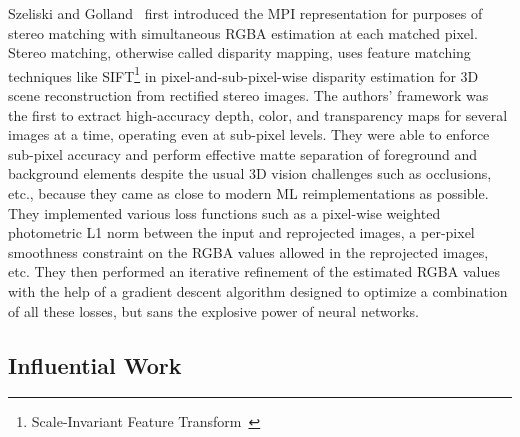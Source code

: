 Szeliski and Golland~\cite{szeliski_stereo_1999} first introduced the MPI representation for purposes of stereo matching with simultaneous RGBA estimation at each matched pixel. Stereo matching, otherwise called disparity mapping, uses feature matching techniques like SIFT\footnote{Scale-Invariant Feature Transform~\cite{lowe_distinctive_2004}} in pixel-and-sub-pixel-wise disparity estimation for 3D scene reconstruction from rectified stereo images. The authors' framework was the first to extract high-accuracy depth, color, and transparency maps for several images at a time, operating even at sub-pixel levels. They were able to enforce sub-pixel accuracy and perform effective matte separation of foreground and background elements despite the usual 3D vision challenges such as occlusions, etc., because they came as close to modern ML reimplementations as possible. They implemented various loss functions such as a pixel-wise weighted photometric L1 norm between the input and reprojected images, a per-pixel smoothness constraint on the RGBA values allowed in the reprojected images, etc. They then performed an iterative refinement of the estimated RGBA values with the help of a gradient descent algorithm designed to optimize a combination of all these losses, but sans the explosive power of neural networks.

\subsection{Influential Work}\label{subsec:influential-work}

